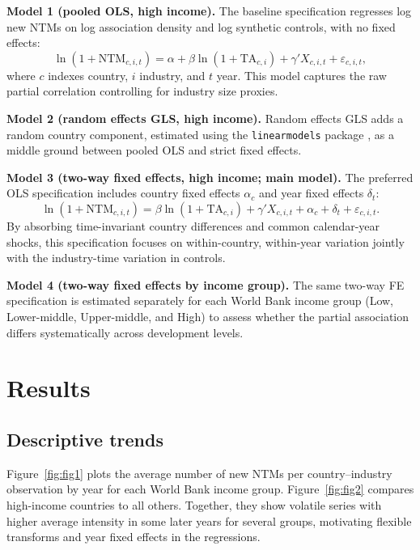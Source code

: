\documentclass[12pt,letterpaper]{article}
\begin{document}
\textbf{Model 1 (pooled OLS, high income).} The baseline specification regresses log new NTMs on log association density and log synthetic controls, with no fixed effects:
\begin{equation}
\ln(1+\mathrm{NTM}_{c,i,t})=\alpha+\beta\ln(1+\mathrm{TA}_{c,i})+\gamma'X_{c,i,t}+\varepsilon_{c,i,t},
\end{equation}
where $c$ indexes country, $i$ industry, and $t$ year. This model captures the raw partial correlation controlling for industry size proxies.

\textbf{Model 2 (random effects GLS, high income).} Random effects GLS adds a random country component, estimated using the \texttt{linearmodels} package \citep{sheppardLinearmodels}, as a middle ground between pooled OLS and strict fixed effects.

\textbf{Model 3 (two-way fixed effects, high income; main model).} The preferred OLS specification includes country fixed effects $\alpha_c$ and year fixed effects $\delta_t$:
\begin{equation}
\ln(1+\mathrm{NTM}_{c,i,t})=\beta\ln(1+\mathrm{TA}_{c,i})+\gamma'X_{c,i,t}+\alpha_c+\delta_t+\varepsilon_{c,i,t}.
\end{equation}
By absorbing time-invariant country differences and common calendar-year shocks, this specification focuses on within-country, within-year variation jointly with the industry-time variation in controls.

\textbf{Model 4 (two-way fixed effects by income group).} The same two-way FE specification is estimated separately for each World Bank income group (Low, Lower-middle, Upper-middle, and High) to assess whether the partial association differs systematically across development levels.

\section{Results}

\subsection{Descriptive trends}

Figure~\ref{fig:fig1} plots the average number of new NTMs per country--industry observation by year for each World Bank income group. Figure~\ref{fig:fig2} compares high-income countries to all others. Together, they show volatile series with higher average intensity in some later years for several groups, motivating flexible transforms and year fixed effects in the regressions.
\end{document}
